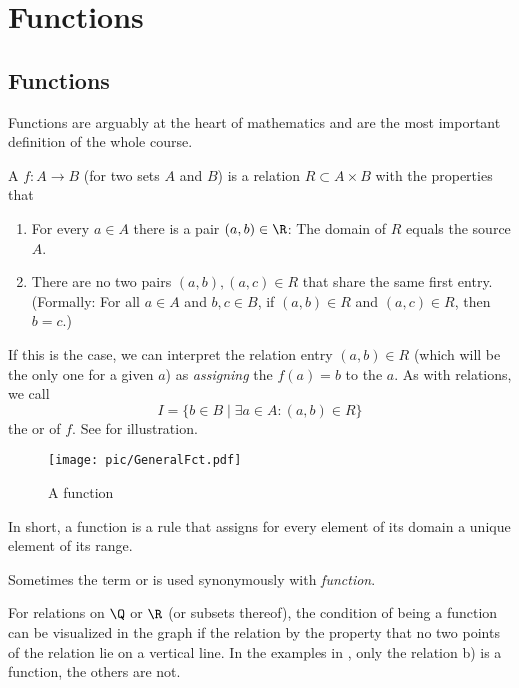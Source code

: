 \chapter{Functions}
\label{chfuns}

\section{Functions}

Functions are arguably at the heart of mathematics and are the most
important definition of the whole course.

\begin{defn}
A  $f\colon A\to B$ (for two sets $A$ and $B$) is a relation $R\subset
A\times B$ with the properties that
\begin{enumerate}
\item 
For every $a\in A$ there is a pair $(a,b)\in\R$: The domain of $R$ equals the source $A$.
\item
There
are no two pairs $(a,b),(a,c)\in R$ that share the same first entry.
(Formally: 
For all $a\in A$ and $b,c\in B$, if $(a,b)\in R$ and
$(a,c)\in R$, then $b=c$.)
\end{enumerate}
If this is the case, we can interpret the relation entry $(a,b)\in R$ (which
will be the only one for a given $a$) as {\em assigning} the 
$f(a)=b$ to the  $a$. As with relations, we call 
\[
I=\{b\in B\mid \exists a\in A: (a,b)\in R\}
\]
the  or  of $f$.
See  for illustration.
\end{defn}

\begin{figure}[t]
\begin{center}
\texttt{[image: pic/GeneralFct.pdf]}
\end{center}
\caption{A function}
\label{figgeneralfct}
\end{figure}

In short, a function is a rule that assigns for every element of its domain 
a unique element of its range.

Sometimes the term  or  is used synonymously
with {\em function}.

For relations on $\Q$ or $\R$ (or subsets thereof), the condition of being a
function can be
visualized in the graph if the relation by the property that no two points
of the relation lie on a vertical line. In the examples in
, only the relation b) is a function, the others
are not.
\smallskip

